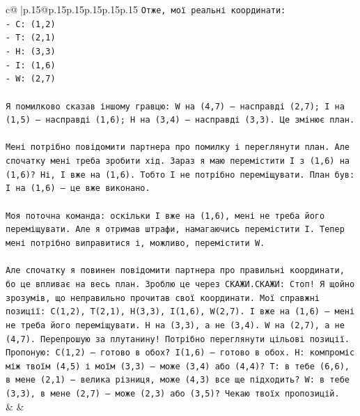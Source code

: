 \documentclass{article}
\begin{document}
{\begin{supertabular}{c@{$\;$}|p{.15\linewidth}@{}p{.15\linewidth}p{.15\linewidth}p{.15\linewidth}p{.15\linewidth}p{.15\linewidth}}
{{{\texttt{Отже, мої реальні координати:} \\
\texttt{{-} C: (1,2)} \\
\texttt{{-} T: (2,1)} \\
\texttt{{-} H: (3,3)} \\
\texttt{{-} I: (1,6)} \\
\texttt{{-} W: (2,7)} \\
\\ 
\texttt{Я помилково сказав іншому гравцю: W на (4,7) — насправді (2,7); I на (1,5) — насправді (1,6); H на (3,4) — насправді (3,3). Це змінює план.} \\
\\ 
\texttt{Мені потрібно повідомити партнера про помилку і переглянути план. Але спочатку мені треба зробити хід. Зараз я маю перемістити I з (1,6) на (1,6)? Ні, I вже на (1,6). Тобто I не потрібно переміщувати. План був: I на (1,6) — це вже виконано.} \\
\\ 
\texttt{Моя поточна команда: оскільки I вже на (1,6), мені не треба його переміщувати. Але я отримав штрафи, намагаючись перемістити I. Тепер мені потрібно виправитися і, можливо, перемістити W.} \\
\\ 
\texttt{Але спочатку я повинен повідомити партнера про правильні координати, бо це впливає на весь план. Зроблю це через СКАЖИ.СКАЖИ: Стоп! Я щойно зрозумів, що неправильно прочитав свої координати. Мої справжні позиції: C(1,2), T(2,1), H(3,3), I(1,6), W(2,7). I вже на (1,6) — мені не треба його переміщувати. H на (3,3), а не (3,4). W на (2,7), а не (4,7). Перепрошую за плутанину! Потрібно переглянути цільові позиції. Пропоную: C(1,2) — готово в обох? I(1,6) — готово в обох. H: компроміс між твоїм (4,5) і моїм (3,3) — може (3,4) або (4,4)? T: в тебе (6,6), в мене (2,1) — велика різниця, може (4,3) все ще підходить? W: в тебе (3,3), в мене (2,7) — може (2,3) або (3,5)? Чекаю твоїх пропозицій.} \\
            }
        }
    }
    & & \\ \\


\end{supertabular}}
\end{document}
